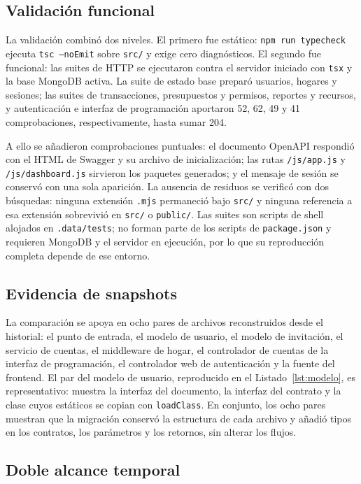 \documentclass[conference]{IEEEtran}
\begin{document}
\subsection{Validación funcional}

La validación combinó dos niveles. El primero fue estático: \texttt{npm run
typecheck} ejecuta \texttt{tsc --noEmit} sobre \texttt{src/} y exige cero
diagnósticos. El segundo fue funcional: las suites de HTTP se ejecutaron contra
el servidor iniciado con \texttt{tsx} y la base MongoDB activa. La suite de
estado base preparó usuarios, hogares y sesiones; las suites de transacciones,
presupuestos y permisos, reportes y recursos, y autenticación e interfaz de
programación aportaron 52, 62, 49 y 41 comprobaciones, respectivamente, hasta
sumar 204.

A ello se añadieron comprobaciones puntuales: el documento OpenAPI respondió
con el HTML de Swagger y su archivo de inicialización; las rutas
\texttt{/js/app.js} y \texttt{/js/dashboard.js} sirvieron los paquetes
generados; y el mensaje de sesión se conservó con una sola aparición. La
ausencia de residuos se verificó con dos búsquedas: ninguna extensión
\texttt{.mjs} permaneció bajo \texttt{src/} y ninguna referencia a esa extensión
sobrevivió en \texttt{src/} o \texttt{public/}. Las suites son scripts de shell
alojados en \texttt{.data/tests}; no forman parte de los scripts de
\texttt{package.json} y requieren MongoDB y el servidor en ejecución, por lo que
su reproducción completa depende de ese entorno.

\subsection{Evidencia de snapshots}

La comparación se apoya en ocho pares de archivos reconstruidos desde el
historial: el punto de entrada, el modelo de usuario, el modelo de invitación,
el servicio de cuentas, el middleware de hogar, el controlador de cuentas de la
interfaz de programación, el controlador web de autenticación y la fuente del
frontend. El par del modelo de usuario, reproducido en el
Listado~\ref{lst:modelo}, es representativo: muestra la interfaz del documento,
la interfaz del contrato y la clase cuyos estáticos se copian con
\texttt{loadClass}. En conjunto, los ocho pares muestran que la migración
conservó la estructura de cada archivo y añadió tipos en los contratos, los
parámetros y los retornos, sin alterar los flujos.

\subsection{Doble alcance temporal}
\label{sec:doble-alcance}
\end{document}
